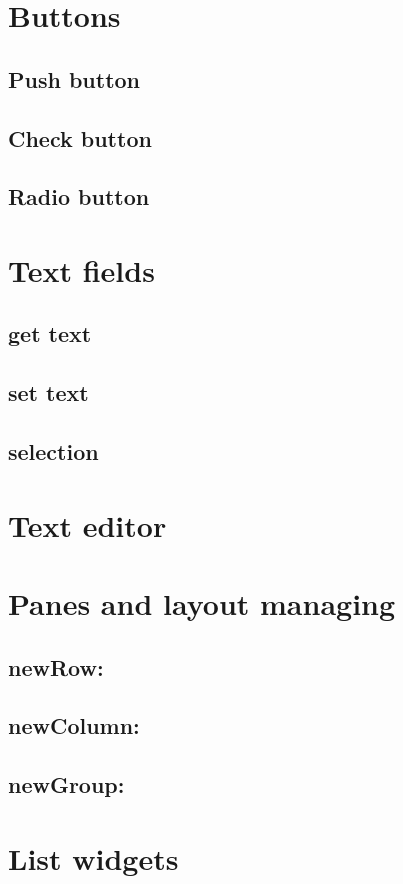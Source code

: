 \documentclass[a4paper,10pt,twoside]{book}
\begin{document}
\section{Buttons}
\subsection{Push button}
\subsection{Check button}
\subsection{Radio button}

\section{Text fields}
\subsection{get text}
\subsection{set text}
\subsection{selection}

\section{Text editor}

\section{Panes and layout managing}
\subsection{newRow:}
\subsection{newColumn:}
\subsection{newGroup:}

\section{List widgets}
\end{document}
